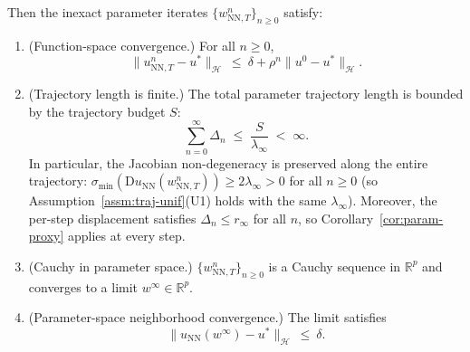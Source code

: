 \documentclass[twoside,11pt]{article}
\newcommand{\R}{\mathbb{R}}
\newcommand{\D}{\mathrm{D}}
\newcommand{\NN}{\mathrm{NN}}
\newcommand{\calH}{\mathcal{H}}
\begin{document}
\begin{theorem}
Then the inexact parameter iterates $\{w^n_{\NN,T}\}_{n\ge 0}$ satisfy:
\begin{enumerate}
\item[(a)] (Function-space convergence.) For all $n\ge 0$,
\begin{equation*}
\|u^n_{\NN,T}-u^*\|_\calH \ \le\ \delta + \rho^n\|u^0-u^*\|_\calH .
\end{equation*}

\item[(b)] (Trajectory length is finite.) The total parameter trajectory length is bounded by the trajectory budget $S$:
\begin{equation}\label{eq:trajectory-bound}
\sum_{n=0}^{\infty}\Delta_n \;\le\; \frac{S}{\lambda_\infty} \;<\; \infty.
\end{equation}
In particular, the Jacobian non-degeneracy is preserved along the entire trajectory:
$\sigma_{\min}(\D u_\NN(w^n_{\NN,T}))\ge 2\lambda_\infty>0$ for all $n\ge 0$ (so Assumption~\ref{assm:traj-unif}(U1) holds with the same $\lambda_\infty$).
Moreover, the per-step displacement satisfies $\Delta_n\le r_\infty$ for all $n$,
so Corollary~\ref{cor:param-proxy} applies at every step.

\item[(c)] (Cauchy in parameter space.) $\{w^n_{\NN,T}\}_{n\ge 0}$ is a Cauchy sequence in $\R^p$
and converges to a limit $w^\infty\in\R^p$.

\item[(d)] (Parameter-space neighborhood convergence.) The limit satisfies
\begin{equation*}
\|u_\NN(w^\infty)-u^*\|_\calH \ \le\ \delta.
\end{equation*}
\end{enumerate}
\end{theorem}
\end{document}
